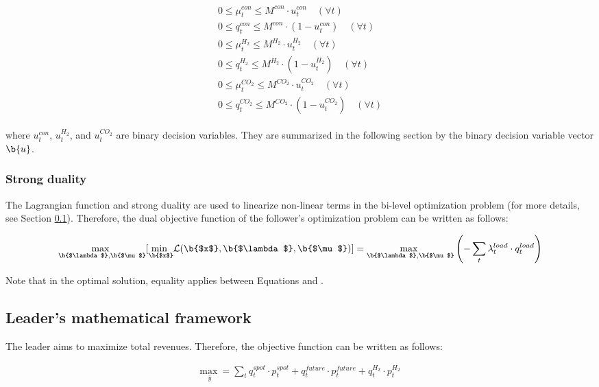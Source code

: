 \documentclass[review]{elsarticle}
\begin{document}
\begin{align}\label{cc}
\begin{aligned}
0 \leq \mu_{t}^{con} \leq M^{con} \cdot u_{t}^{con} \quad (\forall t)\\
0 \leq q_{t}^{con} \leq M^{con} \cdot (1-u_{t}^{con}) \quad (\forall t)\\
0 \leq \mu_{t}^{H_2} \leq M^{H_2} \cdot u_{t}^{H_2}\quad (\forall t)\\
0 \leq q_{t}^{H_2} \leq M^{H_2} \cdot (1-u_{t}^{H_2})\quad (\forall t)\\
0 \leq \mu_{t}^{CO_2} \leq M^{CO_2} \cdot u_{t}^{CO_2}\quad (\forall t)\\
0 \leq q_{t}^{CO_2} \leq M^{CO_2} \cdot (1-u_{t}^{CO_2})\quad (\forall t)
\end{aligned}
\end{align}

where $u_{t}^{con}$, $u_{t}^{H_2}$, and $u_{t}^{CO_2}$ are binary decision variables. They are summarized in the following section by the binary decision variable vector $\b{u}$.

\subsubsection{Strong duality}
The Lagrangian function and strong duality are used to linearize non-linear terms in the bi-level optimization problem (for more details, see Section \ref{sec:leader}). Therefore, the dual objective function of the follower's optimization problem can be written as follows:

\begin{align}\label{duality}
	\underset{\b{$\lambda$}, \b{$\mu$}}{\mathrm{max~}} [\underset{\b{$x$}}{\mathrm{min~}} \mathcal{L}(\b{$x$}, \b{$\lambda$}, \b{$\mu$})] =\underset{\b{$\lambda$}, \b{$\mu$}}{\mathrm{max~}} \left(- \sum_{t} \lambda_{t}^{load}\cdot q_{t}^{load}\right)
\end{align}

Note that in the optimal solution, equality applies between Equations  and .

\subsection{Leader's mathematical framework}\label{sec:leader}
The leader aims to maximize total revenues. Therefore, the objective function can be written as follows: 

\begin{align}
\underset{\bar{y}}{\mathrm{max~}} = \sum_{t} q_{t}^{spot}\cdot p_{t}^{spot}+q_{t}^{future}\cdot p_{t}^{future}+q_{t}^{H_2}\cdot p_{t}^{H_2}
\end{align}
\end{document}

